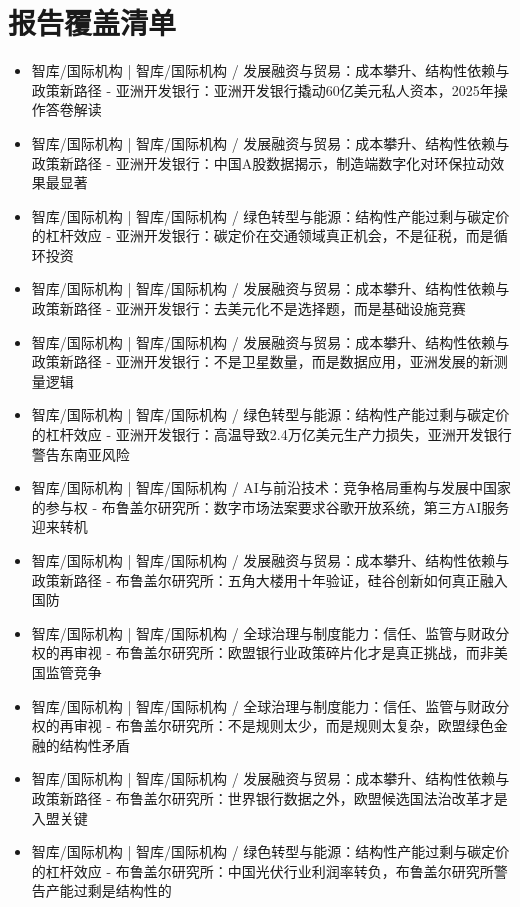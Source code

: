 \documentclass[11pt]{ctexart}
\begin{document}
\section{报告覆盖清单}
\begin{itemize}
  \item [R001] 智库/国际机构 | 智库/国际机构 / 发展融资与贸易：成本攀升、结构性依赖与政策新路径 - 亚洲开发银行：亚洲开发银行撬动60亿美元私人资本，2025年操作答卷解读
  \item [R002] 智库/国际机构 | 智库/国际机构 / 发展融资与贸易：成本攀升、结构性依赖与政策新路径 - 亚洲开发银行：中国A股数据揭示，制造端数字化对环保拉动效果最显著
  \item [R003] 智库/国际机构 | 智库/国际机构 / 绿色转型与能源：结构性产能过剩与碳定价的杠杆效应 - 亚洲开发银行：碳定价在交通领域真正机会，不是征税，而是循环投资
  \item [R004] 智库/国际机构 | 智库/国际机构 / 发展融资与贸易：成本攀升、结构性依赖与政策新路径 - 亚洲开发银行：去美元化不是选择题，而是基础设施竞赛
  \item [R005] 智库/国际机构 | 智库/国际机构 / 发展融资与贸易：成本攀升、结构性依赖与政策新路径 - 亚洲开发银行：不是卫星数量，而是数据应用，亚洲发展的新测量逻辑
  \item [R006] 智库/国际机构 | 智库/国际机构 / 绿色转型与能源：结构性产能过剩与碳定价的杠杆效应 - 亚洲开发银行：高温导致2.4万亿美元生产力损失，亚洲开发银行警告东南亚风险
  \item [R007] 智库/国际机构 | 智库/国际机构 / AI与前沿技术：竞争格局重构与发展中国家的参与权 - 布鲁盖尔研究所：数字市场法案要求谷歌开放系统，第三方AI服务迎来转机
  \item [R008] 智库/国际机构 | 智库/国际机构 / 发展融资与贸易：成本攀升、结构性依赖与政策新路径 - 布鲁盖尔研究所：五角大楼用十年验证，硅谷创新如何真正融入国防
  \item [R009] 智库/国际机构 | 智库/国际机构 / 全球治理与制度能力：信任、监管与财政分权的再审视 - 布鲁盖尔研究所：欧盟银行业政策碎片化才是真正挑战，而非美国监管竞争
  \item [R010] 智库/国际机构 | 智库/国际机构 / 全球治理与制度能力：信任、监管与财政分权的再审视 - 布鲁盖尔研究所：不是规则太少，而是规则太复杂，欧盟绿色金融的结构性矛盾
  \item [R011] 智库/国际机构 | 智库/国际机构 / 发展融资与贸易：成本攀升、结构性依赖与政策新路径 - 布鲁盖尔研究所：世界银行数据之外，欧盟候选国法治改革才是入盟关键
  \item [R012] 智库/国际机构 | 智库/国际机构 / 绿色转型与能源：结构性产能过剩与碳定价的杠杆效应 - 布鲁盖尔研究所：中国光伏行业利润率转负，布鲁盖尔研究所警告产能过剩是结构性的

\end{itemize}
\end{document}
